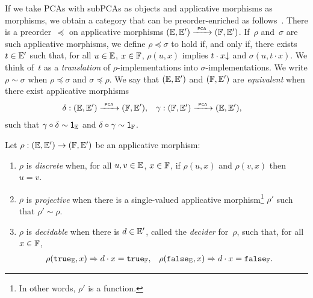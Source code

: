 If we take PCAs with subPCAs as objects and applicative morphisms as
morphisms, we obtain a category that can be preorder-enriched as
follows~\cite[Proposition 2.1.6]{Longley:94}.
%
%
%
%
%
%
There is a preorder~$\preceq$ on applicative morphisms $({\mathbb{E}}, {\mathbb{E}'})
\xrightarrow{\scriptscriptstyle\mathsf{\ PCA\ }}{} ({\mathbb{F}}, {\mathbb{E}'})$. If~$\rho$ and~$\sigma$ are such applicative
morphisms, we define $\rho \preceq \sigma$ to hold if, and only if,
there exists $t \in {\mathbb{E}'}$ such that, for all $u \in {\mathbb{E}}$, $x \in
{\mathbb{F}}$, $\rho(u, x)$ implies $t \cdot x{\downarrow}$ and $\sigma(u, t \cdot x)$. We think
of~$t$ as a \emph{translation} of $\rho$-implementations into
$\sigma$-implementations. We write $\rho \sim \sigma$ when $\rho
\preceq \sigma$ and $\sigma \preceq \rho$. We say that $({\mathbb{E}}, {\mathbb{E}'})$
and $({\mathbb{F}}, {\mathbb{E}'})$ are \emph{equivalent} when there exist applicative
morphisms
\begin{align*}
  \delta &: ({\mathbb{E}}, {\mathbb{E}'}) \xrightarrow{\scriptscriptstyle\mathsf{\ PCA\ }}{} ({\mathbb{F}}, {\mathbb{E}'}),
  &
  \gamma &: ({\mathbb{F}}, {\mathbb{E}'}) \xrightarrow{\scriptscriptstyle\mathsf{\ PCA\ }}{} ({\mathbb{E}}, {\mathbb{E}'}),
\end{align*}
such that $\gamma \circ \delta \sim \mathsf{1}_{\mathbb{E}}$ and $\delta \circ \gamma
\sim \mathsf{1}_{\mathbb{F}}$.

\begin{definition}
  Let $\rho: ({\mathbb{E}}, {\mathbb{E}'}) \to ({\mathbb{F}}, {\mathbb{E}'})$ be an applicative
  morphism:
  \begin{enumerate}
  \item[(1)] $\rho$ is \emph{discrete} when, for all $u, v \in {\mathbb{E}}$,
    $x \in {\mathbb{F}}$, if $\rho(u, x)$ and $\rho(v, x)$ then $u = v$.
  \item[(2)] $\rho$ is \emph{projective} when there is a single-valued
    applicative morphism\footnote{In other words, $\rho'$ is a
      function.} $\rho'$ such that $\rho' \sim \rho$.
  \item[(3)] $\rho$ is \emph{decidable} when there is $d \in {\mathbb{E}'}$,
    called the
    \emph{decider} for~$\rho$, such that, for all $x \in
    {\mathbb{F}}$,
    \begin{align*}
      \rho(\mathtt{true}_{\mathbb{E}}, x) &\Rightarrow d \cdot x = \mathtt{true}_{\mathbb{F}},
      &
      \rho(\mathtt{false}_{\mathbb{E}}, x) &\Rightarrow d \cdot x = \mathtt{false}_{\mathbb{F}}.
    \end{align*}
  \end{enumerate}
\end{definition}



